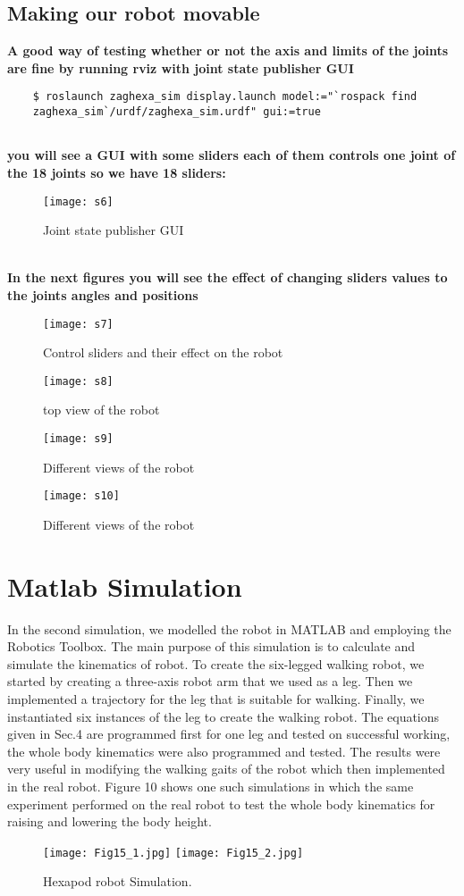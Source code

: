 	\subsection{Making our robot movable}
	\textbf{A good way of testing whether or not the axis and limits of the joints are fine by running rviz with joint state publisher GUI}
	\begin{lstlisting}
	$ roslaunch zaghexa_sim display.launch model:="`rospack find
	zaghexa_sim`/urdf/zaghexa_sim.urdf" gui:=true
	
	\end{lstlisting}
	\textbf{you will see a GUI with some sliders each of them controls one joint of the 18 joints so we have 18 sliders:}
	\begin{figure}[h]
		\centering
		\texttt{[image: s6]}
		\caption{Joint state publisher GUI}
		\label{fig:s6}
	\end{figure}
	\\\textbf{In the next figures you will see the effect of changing sliders values to the joints angles and positions}
	\begin{figure}[h]
		\centering
		\texttt{[image: s7]}
		\caption{Control sliders and their effect on the robot }
		\label{fig:s7}
	\end{figure}
	\begin{figure}[htb]
		\centering
		\texttt{[image: s8]}
		\caption{top view of the robot}
		\label{fig:s8}
		\texttt{[image: s9]}
		\caption{Different views of the robot}
		\label{fig:s9}
		\texttt{[image: s10]}
		\caption{Different views of the robot}
		\label{fig:s10}
	\end{figure}
\clearpage
\vspace{10cm}
\section{ Matlab Simulation}
In the second simulation, we modelled the robot in MATLAB and employing the Robotics Toolbox. The main purpose of this simulation is to calculate and simulate the kinematics of robot. To create the six-legged walking robot, we started by creating a three-axis robot arm that we used as a leg. Then we implemented a trajectory for the leg that is suitable for walking. Finally, we instantiated six instances of the leg to create the walking robot. The equations given in Sec.4 are programmed first for one leg and tested on successful working, the whole body kinematics were also programmed and tested.
The results were very useful in modifying the walking gaits of the robot which then implemented in the real robot. Figure 10 shows one such simulations in which the same experiment performed on the real robot to test the whole body kinematics for raising and lowering the body height.

\begin{figure}[h]
	\centering
	\texttt{[image: Fig15\_1.jpg]} 
	\texttt{[image: Fig15\_2.jpg]}
	\caption{ Hexapod robot Simulation.}
	\label{sim}
\end{figure}